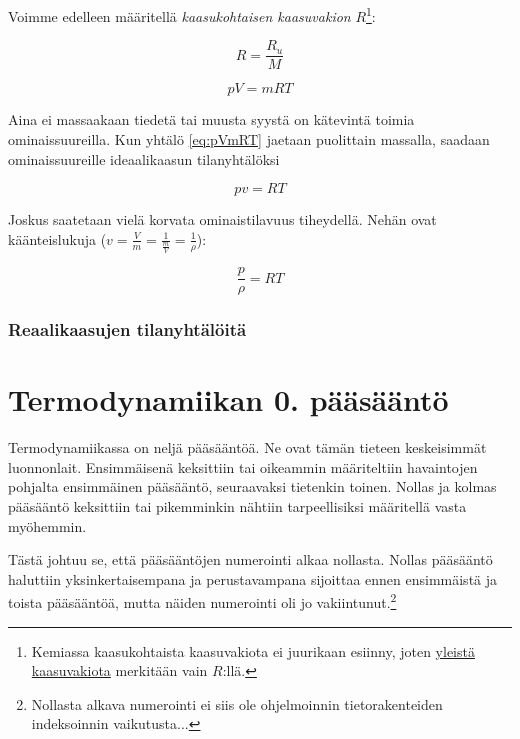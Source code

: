 \documentclass[12pt,a4paper,finnish]{book}
\begin{document}
Voimme edelleen määritellä \textit{kaasukohtaisen kaasuvakion} $R$\footnote{Kemiassa 
kaasukohtaista kaasuvakiota ei juurikaan esiinny, joten \underline{yleistä kaasuvakiota} merkitään 
vain $R$:llä.}:

\begin{equation}
  R = \frac{R_u}{M}
\end{equation}

\begin{framed}
\begin{equation}
\label{eq:pVmRT}
 pV = mRT
\end{equation}
\end{framed}

Aina ei massaakaan tiedetä tai muusta syystä on kätevintä toimia ominaissuureilla. Kun yhtälö 
\ref{eq:pVmRT} jaetaan puolittain massalla, saadaan ominaissuureille ideaalikaasun tilanyhtälöksi

\begin{framed}
\begin{equation}
 pv = RT
\end{equation}
\end{framed}

Joskus saatetaan vielä korvata ominaistilavuus tiheydellä. Nehän ovat käänteislukuja 
($v = \frac{V}{m} = \frac{1}{\frac{m}{V}} = \frac{1}{\rho}$):

\begin{equation}
 \frac{p}{\rho} = RT
\end{equation}

\subsection{Reaalikaasujen tilanyhtälöitä}

\chapter{Termodynamiikan 0. pääsääntö} %

Termodynamiikassa on neljä pääsääntöä. Ne ovat tämän tieteen keskeisimmät luonnonlait. Ensimmäisenä 
keksittiin tai oikeammin määriteltiin havaintojen pohjalta ensimmäinen pääsääntö, seuraavaksi tietenkin 
toinen. Nollas ja kolmas pääsääntö keksittiin tai pikemminkin nähtiin tarpeellisiksi määritellä vasta 
myöhemmin. 

Tästä johtuu se, että pääsääntöjen numerointi alkaa nollasta. Nollas 
pääsääntö haluttiin yksinkertaisempana ja perustavampana sijoittaa ennen ensimmäistä ja toista 
pääsääntöä, mutta näiden numerointi oli jo vakiintunut.\footnote{Nollasta alkava numerointi ei siis 
ole ohjelmoinnin tietorakenteiden indeksoinnin vaikutusta...}
\end{document}
